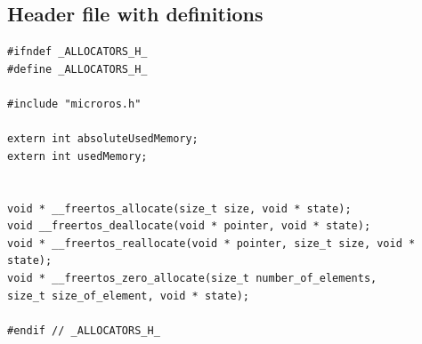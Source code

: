 \documentclass[10pt]{article}
\begin{document}
\subsection{Header file with definitions}
\begin{verbatim}
#ifndef _ALLOCATORS_H_
#define _ALLOCATORS_H_

#include "microros.h"

extern int absoluteUsedMemory;
extern int usedMemory;


void * __freertos_allocate(size_t size, void * state);
void __freertos_deallocate(void * pointer, void * state);
void * __freertos_reallocate(void * pointer, size_t size, void * state);
void * __freertos_zero_allocate(size_t number_of_elements,
size_t size_of_element, void * state);

#endif // _ALLOCATORS_H_
\end{verbatim}
\end{document}

